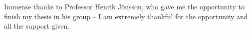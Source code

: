 
\begin{acknowledgements}      

Immense thanks to Professor Henrik Jönsson, who gave me the opportunity to
finish my thesis in his group -- I am extremely thankful for the opportunity and
all the support given. 

\end{acknowledgements}
